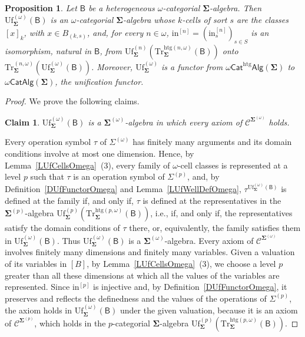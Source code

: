 \documentclass[a4paper, reqno]{amsbook}
\newcommand{\sig}[1]{\mathbf{#1}}             %
\newcommand{\calg}[1]{\boldsymbol{\mathsf{#1}}} %
\newcommand{\spec}[1]{\boldsymbol{\mathcal{#1}}} %
\newcommand{\htg}{\mathrm{htg}}                %
\newcommand{\Uf}{\mathrm{Uf}}
\newcommand{\Tr}{\mathrm{Tr}}
\theoremstyle{plain}
\newtheorem{proposition}[theorem]{Proposition}
\newtheorem{claim}[theorem]{Claim}
\theoremstyle{definition}
\begin{document}
\begin{proposition}\label{PUfFunctorOmega}
Let $\calg{B}$ be a heterogeneous $\omega$-categorial $\sig{\Sigma}$-algebra.
Then $\Uf^{(\omega)}_{\sig{\Sigma}}(\calg{B})$ is an $\omega$-categorial $\sig{\Sigma}$-algebra whose $k$-cells of sort $s$ are the classes $[x]_{k}$, with $x\in B_{(k,s)}$, and, for every $n\in\omega$, $\mathrm{in}^{[n]}=(\mathrm{in}^{[n]}_{s})_{s\in S}$ is an isomorphism, natural in $\calg{B}$, from $\Uf^{(n)}_{\sig{\Sigma}}(\Tr^{\htg(n,\omega)}_{\sig{\Sigma}}(\calg{B}))$ onto $\Tr^{(n,\omega)}_{\sig{\Sigma}}(\Uf^{(\omega)}_{\sig{\Sigma}}(\calg{B}))$.
Moreover, $\Uf^{(\omega)}_{\sig{\Sigma}}$ is a functor from $\omega\mathsf{Cat}^{\htg}\mathsf{Alg}(\sig{\Sigma})$ to $\omega\mathsf{CatAlg}(\sig{\Sigma})$, the \emph{unification functor}.
\end{proposition}
\begin{proof}
We prove the following claims.

\begin{claim}\label{ClUfFunctorOmegaA}
$\Uf^{(\omega)}_{\sig{\Sigma}}(\calg{B})$ is a $\sig{\Sigma}^{(\omega)}$-algebra in which every axiom of $\spec{C}^{\sig{\Sigma}^{(\omega)}}$ holds.
\end{claim}
Every operation symbol $\tau$ of $\Sigma^{(\omega)}$ has finitely many arguments and its domain conditions involve at most one dimension.
Hence, by Lemma~\ref{LUfCellsOmega}~(3), every family of $\omega$-cell classes is represented at a level $p$ such that $\tau$ is an operation symbol of $\Sigma^{(p)}$, and, by Definition~\ref{DUfFunctorOmega} and Lemma~\ref{LUfWellDefOmega}, $\tau^{\Uf^{(\omega)}_{\sig{\Sigma}}(\calg{B})}$ is defined at the family if, and only if, $\tau$ is defined at the representatives in the $\sig{\Sigma}^{(p)}$-algebra $\Uf^{(p)}_{\sig{\Sigma}}(\Tr^{\htg(p,\omega)}_{\sig{\Sigma}}(\calg{B}))$, i.e., if, and only if, the representatives satisfy the domain conditions of $\tau$ there, or, equivalently, the family satisfies them in $\Uf^{(\omega)}_{\sig{\Sigma}}(\calg{B})$.
Thus $\Uf^{(\omega)}_{\sig{\Sigma}}(\calg{B})$ is a $\sig{\Sigma}^{(\omega)}$-algebra.
Every axiom of $\spec{C}^{\sig{\Sigma}^{(\omega)}}$ involves finitely many dimensions and finitely many variables.
Given a valuation of its variables in $[B]$, by Lemma~\ref{LUfCellsOmega}~(3), we choose a level $p$ greater than all these dimensions at which all the values of the variables are represented.
Since $\mathrm{in}^{[p]}$ is injective and, by Definition~\ref{DUfFunctorOmega}, it preserves and reflects the definedness and the values of the operations of $\Sigma^{(p)}$, the axiom holds in $\Uf^{(\omega)}_{\sig{\Sigma}}(\calg{B})$ under the given valuation, because it is an axiom of $\spec{C}^{\sig{\Sigma}^{(p)}}$, which holds in the $p$-categorial $\sig{\Sigma}$-algebra $\Uf^{(p)}_{\sig{\Sigma}}(\Tr^{\htg(p,\omega)}_{\sig{\Sigma}}(\calg{B}))$.


\end{proof}
\end{document}
